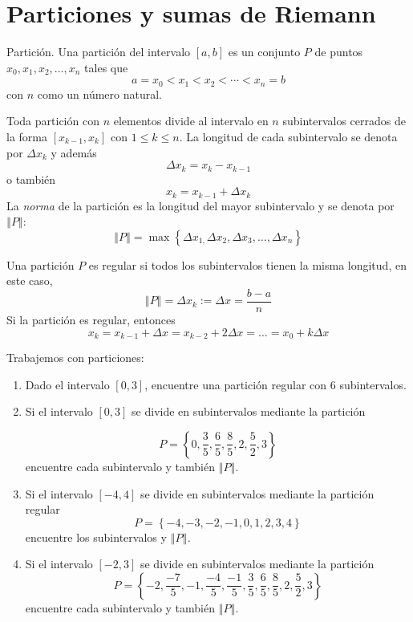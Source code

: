 \section{Particiones y sumas de Riemann}

\begin{defi}
Partición. \textnormal{Una partición del intervalo \textit{$[a,b]$} es un conjunto \textit{$P$} de puntos \textit{$x_{0},x_{1},x_{2},\ldots ,x_{n}$} tales que}
\[
a=x_{0}<x_{1}<x_{2}<\cdots <x_{n}=b
\]
\textnormal{con \textit{$n$} como un número natural.}
\end{defi}

Toda partición con $n$ elementos divide al intervalo en $n$ subintervalos cerrados de la forma $[x_{k-1},x_{k}]$ con $1\leq k\leq n$. La longitud de cada subintervalo se denota por $\Delta x_{k}$ y además
\[
\Delta x_{k}=x_{k}-x_{k-1}
\]
o también
\[
x_{k}=x_{k-1}+\Delta x_{k}
\]
La \textit{norma} de la partición es la longitud del mayor subintervalo y se denota por $\left\Vert P\right\Vert$:
\[
\left\Vert P\right\Vert =\max \left\{ \Delta x_{1,}\Delta
x_{2},\Delta x_{3},\ldots ,\Delta x_{n}\right\} 
\]

Una partición $P$ es regular si todos los subintervalos tienen la misma longitud, en este caso,
\[
\left\Vert P\right\Vert =\Delta x_{k}:=\Delta x=\frac{b-a}{n}
\]
Si la partición es regular, entonces
\[
x_{k}=x_{k-1}+\Delta x=x_{k-2}+2\Delta x=\ldots=x_0+k\Delta x
\]
\begin{ejemplo} 
Trabajemos con particiones:
\renewcommand{\labelenumi}{\normalfont\theenumi.}
\begin{enumerate}[leftmargin=1.2em,   itemindent=0pt,       labelwidth=\labelwidth,labelsep=0.5em,]
\item  \textnormal{Dado el intervalo $\left[ 0,3\right] $, encuentre una partición regular con $6$ subintervalos.}

\item \textnormal{Si el intervalo $\left[ 0,3\right] $ se divide en subintervalos mediante la partición}

\[
\textit{P}=\left\{ 0,\frac{3}{5},\frac{6}{5},\frac{8}{5},2,\frac{5}{2},3\right\}
\]
\textnormal{encuentre cada subintervalo y también} $\left\Vert P\right\Vert$.

\item \textnormal{Si el intervalo $\left[ -4,4\right] $ se divide en subintervalos
mediante la partición regular}
\[
\textit{P}=\left\{ -4,-3,-2,-1,0,1,2,3,4\right\}
\]
\textnormal{encuentre los subintervalos y} \textit{$\left\Vert P\right\Vert $.}

\item \textnormal{Si el intervalo $\left[ -2,3\right] $ se divide en subintervalos mediante la partición}
\[
P=\left\{
-2,\frac{-7}{5},-1,\frac{-4}{5},\frac{-1}{5},\frac{3}{5},\frac{6}{5},\frac{8}{5},2,\frac{5}{2},3\right\}
\]
\textnormal{encuentre cada subintervalo y también} $\left\Vert P\right\Vert$.

\end{enumerate}
\end{ejemplo}


